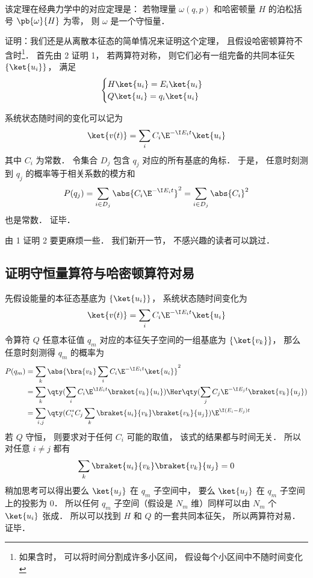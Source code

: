 该定理在经典力学中的对应定理是： 若物理量 $\omega(q, p)$ 和哈密顿量 $H$ 的泊松括号 $\pb{\omega}{H}$ 为零， 则 $\omega$ 是一个守恒量．

证明：我们还是从离散本征态的简单情况来证明这个定理， 且假设哈密顿算符不含时\footnote{如果含时， 可以将时间分割成许多小区间， 假设每个小区间中不随时间变化}． 首先由 2 证明 1， 若两算符对称， 则它们必有一组完备的共同本征矢 $\{\ket{u_i}\}$， 满足
\begin{equation}
\begin{cases}
H \ket{u_i} = E_i \ket{u_i}\\
Q \ket{u_i} = q_i \ket{u_i}
\end{cases}
\end{equation}

系统状态随时间的变化可以记为
\begin{equation}
\ket{v(t)} = \sum_i C_i \E^{-\I E_i t} \ket{u_i}
\end{equation}
其中 $C_i$ 为常数． 令集合 $D_j$ 包含 $q_j$ 对应的所有基底的角标． 于是， 任意时刻测到 $q_j$ 的概率等于相关系数的模方和
\begin{equation}
P(q_j) = \sum_{i \in D_j} \abs{C_i \E^{-\I E_i t}}^2 = \sum_{i \in D_j} \abs{C_i}^2
\end{equation}
也是常数． 证毕．

由 1 证明 2 要更麻烦一些． 我们新开一节， 不感兴趣的读者可以跳过．

\subsection{证明守恒量算符与哈密顿算符对易}
先假设能量的本征态基底为 $\{\ket{u_i}\}$， 系统状态随时间变化为
\begin{equation}
\ket{v(t)} = \sum_i C_i \E^{-\I E_i t} \ket{u_i}
\end{equation}
令算符 $Q$ 任意本征值 $q_m$ 对应的本征矢子空间的一组基底为 $\{\ket{v_k}\}$， 那么任意时刻测得 $q_m$ 的概率为
\begin{equation}
\begin{aligned}
P(q_m) &= \sum_k \abs{\bra{v_k} \sum_i C_i \E^{-\I E_i t} \ket{u_i}}^2\\
&= \sum_k \qty(\sum_i C_i \E^{\I E_i t} \braket{v_k}{u_i})\Her \qty(\sum_j C_j \E^{-\I E_j t} \braket{v_k}{u_j})\\
&= \sum_{i,j} \qty( C_i^* C_j \sum_k \braket{u_i}{v_k} \braket{v_k}{u_j}) \E^{\I (E_i - E_j) t}
\end{aligned}
\end{equation}
若 $Q$ 守恒， 则要求对于任何 $C_i$ 可能的取值， 该式的结果都与时间无关． 所以对任意 $i \ne j$ 都有
\begin{equation}
\sum_k \braket{u_i}{v_k} \braket{v_k}{u_j} = 0
\end{equation}
稍加思考可以得出要么 $\ket{u_j}$ 在 $q_m$ 子空间中， 要么 $\ket{u_j}$ 在 $q_m$ 子空间上的投影为 0． 所以任何 $q_m$ 子空间（假设是 $N_m$ 维）同样可以由 $N_m$ 个 $\ket{u_i}$ 张成． 所以可以找到 $H$ 和 $Q$ 的一套共同本征矢， 所以两算符对易． 证毕．
